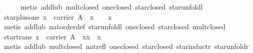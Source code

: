 \begin{isabellebody}
\ \ \ \ %
\endisadelimproof
%
\isatagproof
{}\isamarkupfalse%
\ {}metis\ add{}lub\ mult{}closed\ one{}closed\ star{}closed\ star{}unfoldl{}%
\endisatagproof
{\isafoldproof}%
%
\isadelimproof
\isanewline
%
\endisadelimproof
\isanewline
\ \ \isamarkupfalse%
\ star{}plus{}one{}\ {}x\ {}\ carrier\ A\ {}\ x\ {}\ {}\ {}\ x\isanewline
%
\isadelimproof
\ \ \ \ %
\endisadelimproof
%
\isatagproof
{}\isamarkupfalse%
\ {}metis\ add{}lub\ nat{}order{}def\ star{}unfoldl\ one{}closed\ star{}closed\ mult{}closed{}%
\endisatagproof
{\isafoldproof}%
%
\isadelimproof
\isanewline
%
\endisadelimproof
\isanewline
\ \ \isamarkupfalse%
\ star{}trans{}\ {}x\ {}\ carrier\ A\ {}\ xx\ {}\ x\isanewline
%
\isadelimproof
\ \ \ \ %
\endisadelimproof
%
\isatagproof
{}\isamarkupfalse%
\ {}metis\ add{}lub\ mult{}closed\ nat{}refl\ one{}closed\ star{}closed\ star{}inductr\ star{}unfoldr{}%

\end{isabellebody}
